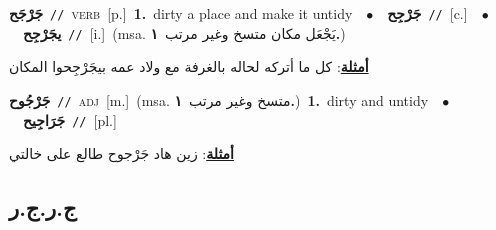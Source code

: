 \documentclass[10pt,a4paper,twoside]{article} %
\begin{document}
\begin{multicols}{2}
{\setlength\topsep{0pt}\textbf{\foreignlanguage{arabic}{جَرْجَح}}\ {\color{gray}\texttt{//}\color{black}}\ \textsc{verb}\ [p.]\ \textbf{1.}~dirty a place and make it untidy\ \ $\bullet$\ \ \setlength\topsep{0pt}\textbf{\foreignlanguage{arabic}{جَرْجِح}}\ {\color{gray}\texttt{//}\color{black}}\ [c.]\ \ $\bullet$\ \ \setlength\topsep{0pt}\textbf{\foreignlanguage{arabic}{يجَرْجِح}}\ {\color{gray}\texttt{//}\color{black}}\ [i.]\ \color{gray}(msa. \foreignlanguage{arabic}{يَجْعَل مكان متسخ وغير مرتب}~\foreignlanguage{arabic}{\textbf{١.}})\color{black}\  \begin{flushright}\color{gray}\foreignlanguage{arabic}{\textbf{\underline{\foreignlanguage{arabic}{أمثلة}}}: كل ما أتركه لحاله بالغرفة مع ولاد عمه بيجَرْجِحوا المكان}\end{flushright}\color{black}} \vspace{2mm}

{\setlength\topsep{0pt}\textbf{\foreignlanguage{arabic}{جَرْجُوح}}\ {\color{gray}\texttt{//}\color{black}}\ \textsc{adj}\ [m.]\ \color{gray}(msa. \foreignlanguage{arabic}{متسخ وغير مرتب}~\foreignlanguage{arabic}{\textbf{١.}})\color{black}\ \textbf{1.}~dirty and untidy\ \ $\bullet$\ \ \setlength\topsep{0pt}\textbf{\foreignlanguage{arabic}{جَرَاجِيح}}\ {\color{gray}\texttt{//}\color{black}}\ [pl.]\  \begin{flushright}\color{gray}\foreignlanguage{arabic}{\textbf{\underline{\foreignlanguage{arabic}{أمثلة}}}: زين هاد جَرْجوح طالع على خالتي}\end{flushright}\color{black}} \vspace{2mm}

\vspace{-3mm}
\subsection*{\color{blue}\foreignlanguage{arabic}{ج.ر.ج.ر}\color{blue}{}} 


\end{multicols}
\end{document}
